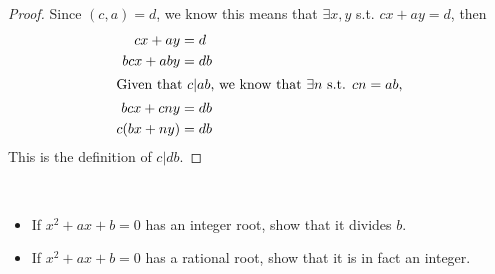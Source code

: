 \documentclass[11pt]{article}
\newenvironment{problem}[2][Problem]{\begin{trivlist}
\item[\hskip \labelsep {\bfseries #1}\hskip \labelsep {\bfseries #2.}]}{\end{trivlist}}
\begin{document}
\begin{proof}
  Since $(c,a)=d$, we know this means that $\exists x,y$ s.t. $cx + ay = d$, then
  \begin{align*}
    cx + ay    & = d  \\
    bcx + aby  & = db \\
    \intertext{Given that $c|ab$, we know that $\exists n$ s.t. $cn = ab$,}
    bcx + cny  & = db \\
    c(bx + ny) & = db \\
  \end{align*}
  This is the definition of $c|db$.
\end{proof}



\begin{problem}{15} ~\\
\begin{itemize}
  \item [(a)] If $x^2+ax+b=0$ has an integer root, show that it divides $b$.
  \item [(b)] If $x^2+ax+b=0$ has a rational root, show that it is in fact an integer.
\end{itemize}
\end{problem}
\end{document}
